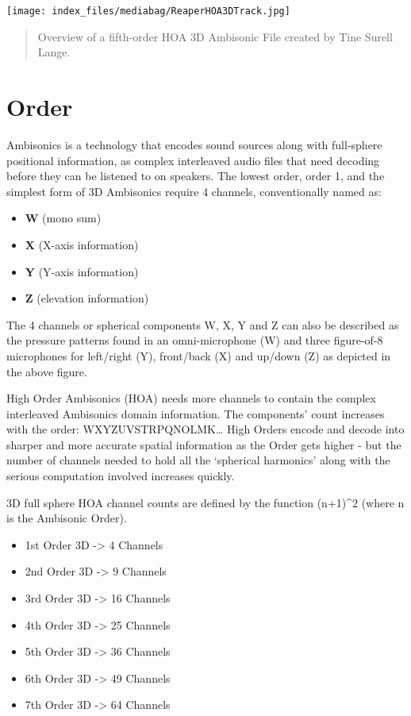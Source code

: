 \documentclass[
  letterpaper,
  DIV=11,
  numbers=noendperiod]{scrreport}
\providecommand{\tightlist}{%
  \setlength{\itemsep}{0pt}\setlength{\parskip}{0pt}}\usepackage{longtable,booktabs,array}
\begin{document}
\texttt{[image: index\_files/mediabag/ReaperHOA3DTrack.jpg]}

\begin{quote}
Overview of a fifth-order HOA 3D Ambisonic File created by Tine Surell
Lange.
\end{quote}

\hypertarget{order}{%
\section{Order}\label{order}}

Ambisonics is a technology that encodes sound sources along with
full-sphere positional information, as complex interleaved audio files
that need decoding before they can be listened to on speakers. The
lowest order, order 1, and the simplest form of 3D Ambisonics require 4
channels, conventionally named as:

\begin{itemize}
\tightlist
\item
  \textbf{W} (mono sum)
\item
  \textbf{X} (X-axis information)
\item
  \textbf{Y} (Y-axis information)
\item
  \textbf{Z} (elevation information)
\end{itemize}

The 4 channels or spherical components W, X, Y and Z can also be
described as the pressure patterns found in an omni-microphone (W) and
three figure-of-8 microphones for left/right (Y), front/back (X) and
up/down (Z) as depicted in the above figure.

High Order Ambisonics (HOA) needs more channels to contain the complex
interleaved Ambisonics domain information. The components' count
increases with the order: WXYZUVSTRPQNOLMK\ldots{} High Orders encode
and decode into sharper and more accurate spatial information as the
Order gets higher - but the number of channels needed to hold all the
`spherical harmonics' along with the serious computation involved
increases quickly.

3D full sphere HOA channel counts are defined by the function (n+1)\^{}2
(where n is the Ambisonic Order).

\begin{itemize}
\tightlist
\item
  1st Order 3D -\textgreater{} 4 Channels
\item
  2nd Order 3D -\textgreater{} 9 Channels
\item
  3rd Order 3D -\textgreater{} 16 Channels
\item
  4th Order 3D -\textgreater{} 25 Channels
\item
  5th Order 3D -\textgreater{} 36 Channels
\item
  6th Order 3D -\textgreater{} 49 Channels
\item
  7th Order 3D -\textgreater{} 64 Channels
\end{itemize}
\end{document}
